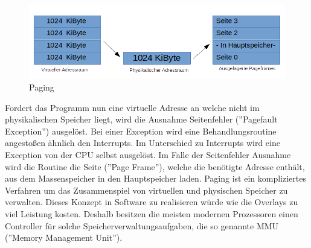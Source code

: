\documentclass[12pt]{article}
\begin{document}
\newpage
\begin{figure}[!htb]
\includegraphics[scale=0.7]{Paging}
\caption{Paging}
\centering
\label{fig:register}
\end{figure}


Fordert das Programm nun eine virtuelle Adresse an welche nicht im physikalischen Speicher liegt, wird die Ausnahme Seitenfehler (''Pagefault Exception'') ausgelöst. Bei einer Exception wird eine Behandlungsroutine angestoßen ähnlich den Interrupts. Im Unterschied zu Interrupts wird eine Exception von der CPU selbst ausgelöst. Im Falle der Seitenfehler Ausnahme wird die Routine die Seite (''Page Frame''), welche die benötigte Adresse enthält, aus dem Massenspeicher in den Hauptspeicher laden. Paging ist ein kompliziertes Verfahren um das Zusammenspiel von virtuellen und physischen Speicher zu verwalten. Dieses Konzept in Software zu realisieren würde wie die Overlays zu viel Leistung kosten. Deshalb besitzen die meisten modernen Prozessoren einen Controller für solche Speicherverwaltungsaufgaben, die so genannte MMU (''Memory Management Unit''). \cite[S.177ff]{mikroprozessortechnik2011}
\end{document}
